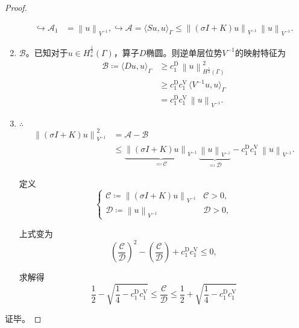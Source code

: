 \begin{proof}
\begin{enumerate}
\begin{equation*}
  \begin{split}
        \hookrightarrow \mathcal{A}_{1} &= \left\| u \right\|_{V^{-1}},
        \hookrightarrow \mathcal{A} = \langle S u, u \rangle_{\Gamma}
        \le \left\| \left( \sigma I + K \right) u \right\|_{V^{-1}} \,
        \left\| u \right\|_{V^{-1}}.
  \end{split}
\end{equation*}

\item $\mathcal{B}$。已知对于$u \in H_{*}^{\frac{1}{2}}(\Gamma)$，算子$D$椭圆。则逆单层位势$V^{-1}$的映射特征为
\begin{equation*}
\begin{split}
  \mathcal{B} \coloneqq \langle D u, u \rangle_{\Gamma}
  & \ge c_{1}^{\text{D}} \, \left\| u \right\|_{H^{\frac{1}{2}}(\Gamma)}^2 \\
  & \ge c_{1}^{\text{D}} c_{1}^{\text{V}} \,
  \langle V^{-1} u, u \rangle_{\Gamma} \\
  & = c_{1}^{\text{D}} c_{1}^{\text{V}} \,
  \left\| u \right\|_{V^{-1}}.
\end{split}
\end{equation*}

\item $\therefore$
\begin{equation*}
  \begin{split}
    \left\| \left(\sigma I + K \right) u \right\|_{V^{-1}}^{2}
    & = \mathcal{A} - \mathcal{B} \\
    & \le
    \underbrace{
    \left\| \left(\sigma I + K \right) u \right\|_{V^{-1}}
    }_{\eqqcolon \mathcal{C}}
    \,
    \underbrace{
    \left\| u \right\|_{V^{-1}}
    }_{\eqqcolon \mathcal{D}}
    - c_{1}^{\text{D}} c_{1}^{\text{V}} \,
    \left\| u \right\|_{V^{-1}}.
  \end{split}
\end{equation*}

定义
\begin{equation*}
  \begin{cases}
    \mathcal{C} \coloneqq \left\| \left(\sigma I + K \right) u \right\|_{V^{-1}} & \mathcal{C} > 0, \\
    \mathcal{D} \coloneqq \left\| u \right\|_{V^{-1}} & \mathcal{D} > 0,
  \end{cases}
\end{equation*}

上式变为
\begin{equation*}
  \left(\frac{\mathcal{C}}{\mathcal{D}} \right)^{2}
  - \left(\frac{\mathcal{C}}{\mathcal{D}} \right)
  + c_{1}^{\text{D}} c_{1}^{\text{V}} \le 0,
\end{equation*}

求解得
\begin{equation*}
  \frac{1}{2} - \sqrt{
  \frac{1}{4} - c_{1}^{\text{D}} c_{1}^{\text{V}}
  }
  \le \frac{\mathcal{C}}{\mathcal{D}}
  \le \frac{1}{2} + \sqrt{
  \frac{1}{4} - c_{1}^{\text{D}} c_{1}^{\text{V}}
  }
\end{equation*}
\end{enumerate}
证毕。
\end{proof}

